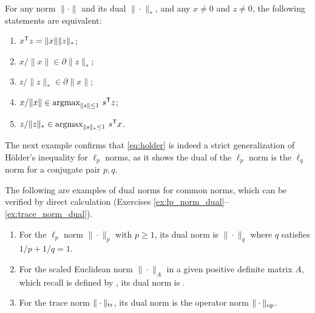 \begin{Theorem}
\label{thm:dual_norm_subgradients}
For any norm $\|\cdot\|$ and its dual $\|\cdot\|_*$, and any $x \not= 0$ and $z 
\not= 0$, the following statements are equivalent:
\begin{enumerate}[label=(\roman*)]
\item $x^{\mathsf{T}} z = \|x\| \|z\|_*$;
\item $x/\|x\| \in \partial \|z\|_*$; 
\item $z/\|z\|_* \in \partial \|x\|$;
\item $x/\|x\| \in \operatorname*{argmax}_{\|s\| \leq 1} \, s^{\mathsf{T}} z$; 
\item $z/\|z\|_* \in \operatorname*{argmax}_{\|s\|_* \leq 1} \, s^{\mathsf{T}} x$. 
\end{enumerate}
\end{Theorem}

The next example confirms that \eqref{eq:holder} is indeed a strict
generalization of H{\"o}lder's inequality for $\ell_p$ norms, as it shows the
dual of the $\ell_p$ norm is the $\ell_q$ norm for a conjugate pair $p,q$.      

\begin{Example}
The following are examples of dual norms for common norms, which can be verified
by direct calculation (Exercises \ref{ex:lp_norm_dual}--\ref{ex:trace_norm_dual}). 

\begin{enumerate}[label=\alph*., ref=\alph*]
\item {} 
  For the $\ell_p$ norm $\|\cdot\|_p$ with $p \geq 1$, its dual norm is
  $\|\cdot\|_q$ where $q$ satisfies $1/p + 1/q = 1$.  

\item {}  
  For the scaled Euclidean norm $\|\cdot\|_A$ in a given positive definite
  matrix $A$, which recall is defined by ,
  its dual norm is .  

\item {}  
  For the trace norm $\|\cdot\|_{\operatorname{tr}}$, its dual norm is the operator norm
  $\|\cdot\|_{\mathrm{op}}$.   
\end{enumerate}
\end{Example}

